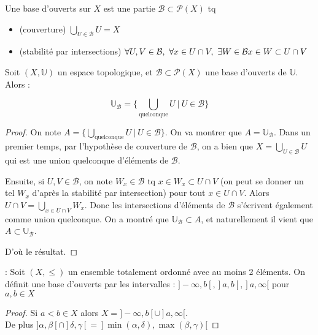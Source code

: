 \begin{definition}
 Une base d'ouverts sur $X$ est une partie $\mathcal{B} \subset \mathcal{P}(X)$ tq
 \begin{itemize}
     \item (couverture) $\bigcup\limits_{U\in \mathcal{B}}U=X$
    \item (stabilité par intersections) $\forall U,V\in \mathcal{B}, \ \forall x \in U\cap V,\ \exists W\in \mathcal{B}\ \\x\in W \subset U\cap V$
\end{itemize}
\end{definition}
\begin{proposition}
Soit $(X,\mathbb{U})$ un espace topologique, et $\mathcal{B} \subset \mathcal{P}(X)$ une base d'ouverts de $\mathbb{U}$. Alors :

$$\mathbb{U}_{\mathcal{B}} = \{\bigcup_{\text{quelconque}} U ~|~ U \in \mathcal{B} \}$$
\end{proposition}
\begin{proof}
On note $A = \{\bigcup_{\text{quelconque}} U ~|~ U \in \mathcal{B} \} $. On va montrer que $A = \mathbb{U}_{\mathcal{B}}$.
    Dans un premier temps, par l'hypothèse de couverture de $\mathcal{B}$, on a bien que $X = \bigcup_{U \in \mathcal{B}} U$ qui est une union quelconque d'éléments de $\mathcal{B}$. 
    
Ensuite, si $U,V\in \mathcal{B}$, on note $W_x\in \mathcal{B}$ tq $x\in W_x \subset U\cap V$ (on peut se donner un tel $W_x$ d'après la stabilité par intersection) pour tout $x\in U\cap V$.
Alors $U\cap V=\bigcup\limits_{x\in U\cap V}W_x$. Donc les intersections d'éléments de $\mathcal{B}$ s'écrivent également comme union quelconque. On a montré que $\mathbb{U}_{\mathcal{B}} \subset A$, et naturellement il vient que $A \subset \mathbb{U}_{\mathcal{B}}$.

D'où le résultat.
\end{proof}
\begin{ex} : Soit $(X,\le )$ un ensemble totalement ordonné avec au moins 2 éléments. On définit une base d'ouverts par les intervalles : $]-\infty , b[, ]a,b[, ]a,\infty [$ pour $ a,b\in X$
\end{ex}
\begin{proof}
    Si $a<b\in X$ alors $X=]-\infty, b[\cup]a, \infty [$. \\
    De plus $] \alpha, \beta[\cap ] \delta, \gamma[ = ]\min(\alpha, \delta) , \max(\beta, \gamma)[$
\end{proof}
